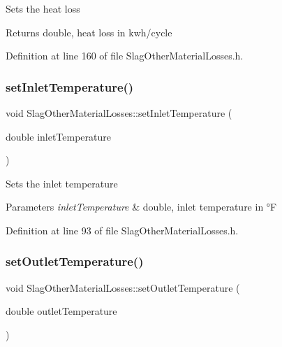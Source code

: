 Sets the heat loss

\begin{DoxyReturn}{Returns}
double, heat loss in kwh/cycle 
\end{DoxyReturn}


Definition at line 160 of file Slag\+Other\+Material\+Losses.\+h.

\mbox{\label{class_slag_other_material_losses_a47bb0a61de501e3e9b7bd2bf2651eb8c}} 
\subsubsection{\texorpdfstring{set\+Inlet\+Temperature()}{setInletTemperature()}}
{\footnotesize\ttfamily void Slag\+Other\+Material\+Losses\+::set\+Inlet\+Temperature (\begin{DoxyParamCaption}\item[{double}]{inlet\+Temperature }\end{DoxyParamCaption})\hspace{0.3cm}{\ttfamily [inline]}}

Sets the inlet temperature


\begin{DoxyParams}{Parameters}
{\em inlet\+Temperature} & double, inlet temperature in °F \\
\hline
\end{DoxyParams}


Definition at line 93 of file Slag\+Other\+Material\+Losses.\+h.

\mbox{\label{class_slag_other_material_losses_afae6aafff94d02926135fabf20a87070}} 
\subsubsection{\texorpdfstring{set\+Outlet\+Temperature()}{setOutletTemperature()}}
{\footnotesize\ttfamily void Slag\+Other\+Material\+Losses\+::set\+Outlet\+Temperature (\begin{DoxyParamCaption}\item[{double}]{outlet\+Temperature }\end{DoxyParamCaption})\hspace{0.3cm}{\ttfamily [inline]}}

